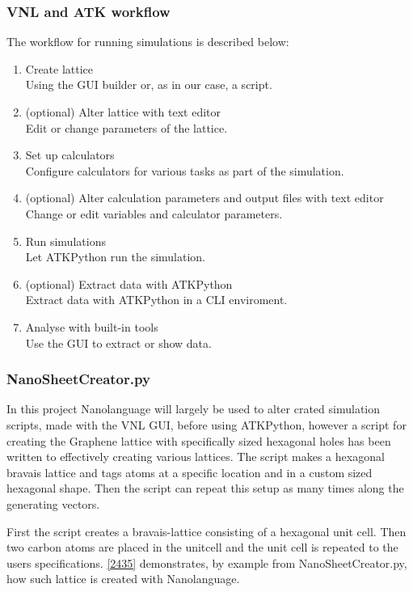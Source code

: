 \subsubsection{VNL and ATK workflow}
The workflow for running simulations is described below:
\begin{enumerate}
 \item Create lattice\\
       Using the GUI builder or, as in our case, a script.
 \item (optional) Alter lattice with text editor\\
       Edit or change parameters of the lattice.
 \item Set up calculators\\
       Configure calculators for various tasks as part of the simulation.
 \item (optional) Alter calculation parameters and output files with text editor\\
       Change or edit variables and calculator parameters.
 \item Run simulations\\
       Let ATKPython run the simulation.
 \item (optional) Extract data with ATKPython\\
       Extract data with ATKPython in a CLI enviroment.
 \item Analyse with built-in tools\\
       Use the GUI to extract or show data.
\end{enumerate}
\subsubsection{NanoSheetCreator.py}
In this project Nanolanguage will largely be used to alter crated simulation scripts, made with the VNL GUI, before using ATKPython, however a script for creating the Graphene lattice with specifically sized hexagonal holes has been written to effectively creating various lattices. The script makes a hexagonal bravais lattice and tags atoms at a specific location and in a custom sized hexagonal shape. Then the script can repeat this setup as many times along the generating vectors.

First the script creates a bravais-lattice consisting of a hexagonal unit cell. Then two carbon atoms are placed in the unitcell and the unit cell is repeated to the users specifications. \cref{2435} demonstrates, by example from NanoSheetCreator.py, how such lattice is created with Nanolanguage.
\onecolumngrid


